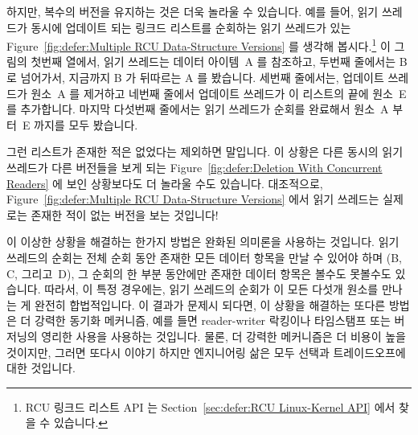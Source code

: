 하지만, 복수의 버전을 유지하는 것은 더욱 놀라울 수 있습니다.
예를 들어,
읽기 쓰레드가 동시에 업데이트 되는 링크드 리스트를 순회하는 읽기 쓰레드가 있는
Figure~\ref{fig:defer:Multiple RCU Data-Structure Versions} 를 생각해
봅시다.\footnote{
	RCU 링크드 리스트 API 는
	Section~\ref{sec:defer:RCU Linux-Kernel API} 에서 찾을 수 있습니다.}
이 그림의 첫번째 열에서, 읽기 쓰레드는 데이터 아이템~A 를 참조하고, 두번째
줄에서는 B 로 넘어가서, 지금까지 B 가 뒤따르는 A 를 봤습니다.
세번째 줄에서는, 업데이트 쓰레드가 원소~A 를 제거하고 네번째 줄에서 업데이트
쓰레드가 이 리스트의 끝에 원소~E 를 추가합니다.
마지막 다섯번째 줄에서는 읽기 쓰레드가 순회를 완료해서 원소~A 부터~E 까지를
모두 봤습니다.

그런 리스트가 존재한 적은 없었다는 제외하면 말입니다.
이 상황은 다른 동시의 읽기 쓰레드가 다른 버전들을 보게 되는
Figure~\ref{fig:defer:Deletion With Concurrent Readers} 에 보인 상황보다도 더
놀라울 수도 있습니다.
대조적으로,
Figure~\ref{fig:defer:Multiple RCU Data-Structure Versions}
에서 읽기 쓰레드는 실제로는 존재한 적이 없는 버전을 보는 것입니다!

이 이상한 상황을 해결하는 한가지 방법은 완화된 의미론을 사용하는 것입니다.
읽기 쓰레드의 순회는 전체 순회 동안 존재한 모든 데이터 항목을 만날 수 있어야
하며 (B, C, 그리고~D), 그 순회의 한 부분 동안에만 존재한 데이터 항목은 볼수도
못볼수도 있습니다.
따라서, 이 특정 경우에는, 읽기 쓰레드의 순회가 이 모든 다섯개 원소를 만나는 게
완전히 합법적입니다.
이 결과가 문제시 되다면, 이 상황을 해결하는 또다른 방법은 더 강력한 동기화
메커니즘, 예를 들면 reader-writer 락킹이나 타임스탬프 또는 버저닝의 영리한
사용을 사용하는 것입니다.
물론, 더 강력한 메커니즘은 더 비용이 높을 것이지만, 그러면 또다시 이야기 하지만
엔지니어링 삶은 모두 선택과 트레이드오프에 대한 것입니다.

